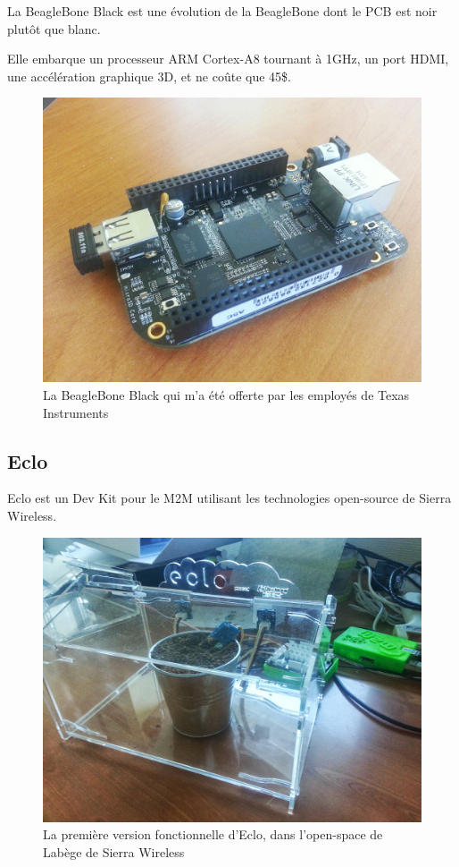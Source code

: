\documentclass{article}
\begin{document}
La BeagleBone Black est une évolution de la BeagleBone dont le PCB est noir plutôt que blanc.

Elle embarque un processeur ARM Cortex-A8 tournant à 1GHz, un port HDMI, une accélération graphique 3D, et ne coûte que 45\$.

\begin{figure}[h!]
    \centering\includegraphics[width=\linewidth/2]{img/bbb.jpg}
    \caption{La BeagleBone Black qui m’a été offerte par les employés de Texas Instruments}
\end{figure}

\clearpage

\subsection{Eclo}
\label{eclo}

Eclo est un Dev Kit pour le M2M utilisant les technologies open-source de Sierra Wireless.


\begin{figure}[h!]
    \centering\includegraphics[width=\linewidth*2/3]{img/eclo.jpg}
    \caption{La première version fonctionnelle d’Eclo, dans l’open-space de Labège de Sierra Wireless}
\end{figure}
\end{document}
